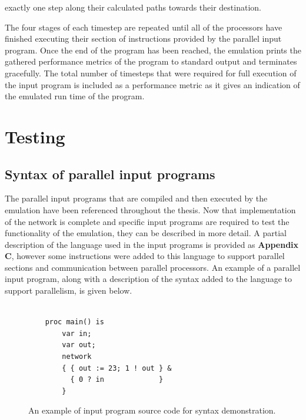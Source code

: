 \documentclass[a4paper, 12pt]{article}
\begin{document}
exactly one step along their calculated paths towards their destination.

The four stages of each timestep are repeated until all of the processors have finished executing their section of instructions provided by the parallel input program. Once the end of the program has been reached, the emulation prints the gathered performance metrics of the program to standard output and terminates gracefully. The total number of timesteps that were required for full execution of the input program is included as a performance metric as it gives an indication of the emulated run time of the program.

\newpage
\section{Testing}

\subsection{Syntax of parallel input programs}
\label{sec:input_program_mods}

The parallel input programs that are compiled and then executed by the emulation have been referenced throughout the thesis. Now that implementation of the network is complete and specific input programs are required to test the functionality of the emulation, they can be described in more detail. A partial description of the language used in the input programs is provided as \textbf{Appendix C}, however some instructions were added to this language to support parallel sections and communication between parallel processors. An example of a parallel input program, along with a description of the syntax added to the language to support parallelism, is given below.\\

\begin{figure}[H]
\begin{lstlisting}

    proc main() is
        var in;
        var out;
        network
        { { out := 23; 1 ! out } &
          { 0 ? in             }
        }

\end{lstlisting}
\caption[An example of input program source code for syntax demonstration]{An example of input program source code for syntax demonstration.}
\label{fig:input_program}
\end{figure}
\end{document}
